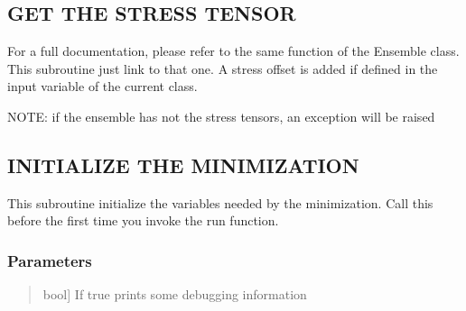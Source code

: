 \documentclass[a4paper,11pt,english]{sphinxmanual}
\begin{document}
\begin{fulllineitems}
\begin{fulllineitems}
\label{\detokenize{apireference:sscha.SchaMinimizer.SSCHA_Minimizer.get_stress_tensor}}
\pysigstartsignatures
{}
\pysigstopsignatures

\subsection{GET THE STRESS TENSOR}
\label{\detokenize{apireference:get-the-stress-tensor}}
\sphinxAtStartPar
For a full documentation, please refer to the same function of the
Ensemble class.
This subroutine just link to that one. A stress offset is added if defined
in the input variable of the current class.

\sphinxAtStartPar
NOTE: if the ensemble has not the stress tensors, an exception will be raised

\end{fulllineitems}


\begin{fulllineitems}
\label{\detokenize{apireference:sscha.SchaMinimizer.SSCHA_Minimizer.init}}
\pysigstartsignatures
{}
\pysigstopsignatures

\subsection{INITIALIZE THE MINIMIZATION}
\label{\detokenize{apireference:initialize-the-minimization}}
\sphinxAtStartPar
This subroutine initialize the variables needed by the minimization.
Call this before the first time you invoke the run function.


\subsubsection{Parameters}
\label{\detokenize{apireference:id33}}\begin{quote}
\begin{description}
\sphinxlineitem{verbosity}{[}bool{]}
\sphinxAtStartPar
If true prints some debugging information


\end{description}
\end{quote}
\end{fulllineitems}
\end{fulllineitems}
\end{document}
